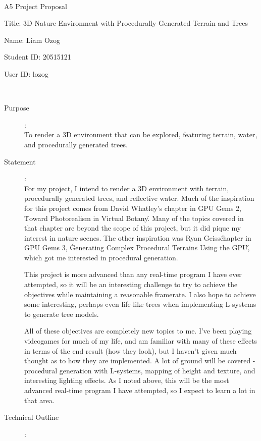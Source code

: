 \documentclass {article}
\begin{document}
~\vfill
\begin{center}
\Large

A5 Project Proposal

Title: 3D Nature Environment with Procedurally Generated Terrain and Trees

Name: Liam Ozog

Student ID: 20515121

User ID: lozog
\end{center}
\vfill ~\vfill~
\newpage
{}
\begin{description}
\item[Purpose]:\\
	To render a 3D environment that can be explored, featuring terrain, water, and procedurally generated trees.

\item[Statement]:\\

	For my project, I intend to render a 3D environment with terrain, procedurally generated trees, and reflective water. Much of the inspiration for this project comes from David Whatley's chapter in GPU Gems 2, \'Toward Photorealism in Virtual Botany\'. Many of the topics covered in that chapter are beyond the scope of this project, but it did pique my interest in nature scenes. The other inspiration was Ryan Geiss\' chapter in GPU Gems 3, \'Generating Complex Procedural Terrains Using the GPU\', which got me interested in procedural generation.

	This project is more advanced than any real-time program I have ever attempted, so it will be an interesting challenge to try to achieve the objectives while maintaining a reasonable framerate. I also hope to achieve some interesting, perhaps even life-like trees when implementing L-systems to generate tree models.

	All of these objectives are completely new topics to me. I've been playing videogames for much of my life, and am familiar with many of these effects in terms of the end result (how they look), but I haven't given much thought as to how they are implemented. A lot of ground will be covered - procedural generation with L-systems, mapping of height and texture, and interesting lighting effects. As I noted above, this will be the most advanced real-time program I have attempted, so I expect to learn a lot in that area.

\item[Technical Outline]:\\


\end{description}
\end{document}
